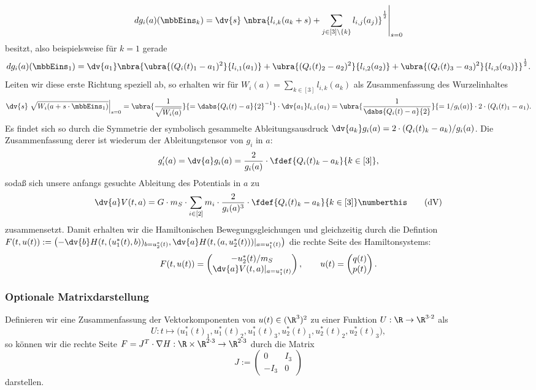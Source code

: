 \documentclass{subfiles}
\begin{document}
        \[
            dg_i(a)(\mbbEins_k) = \dv{s}\left.\nbra{l_{i,k}(a_k + s) + \sum_{j\in[3]\setminus{\{k\}}}l_{i,j}(a_j)}^{\frac12}\right|_{s=0}
        \]
        besitzt, also beispielsweise für $k=1$ gerade
        \[
            dg_i(a)(\mbbEins_1) = \dv{a_1}\nbra{\ubra{(Q_i(t)_1 - a_1)^2}{l_{i,1}(a_1)} + \ubra{(Q_i(t)_2 - a_2)^2}{l_{i,2}(a_2)} + \ubra{(Q_i(t)_3 - a_3)^2}{l_{i,3}(a_3)}}^{\frac12}.
        \]
        Leiten wir diese erste Richtung speziell ab, so erhalten wir für $W_i(a) = \sum_{k\in[3]}l_{i,k}(a_k)$ als Zusammenfassung des Wurzelinhaltes
        \[
            \dv{s}\left.\sqrt{W_i(a + s\cdot\mbbEins_1)}\right|_{s=0} = \ubra{\frac{1}{\sqrt{W_i(a)}}}{=\dabs{Q_i(t) - a}{2}^{-1}}\cdot\dv{a_1}l_{i,1}(a_1) = \ubra{\frac{1}{\dabs{Q_i(t) - a}{2}}}{= 1/g_i(a)}\cdot 2\cdot (Q_i(t)_1 - a_1). 
        \]
        Es findet sich so durch die Symmetrie der symbolisch gesammelte Ableitungsausdruck $\dv{a_k}g_i(a) = 2\cdot (Q_i(t)_k - a_k) / g_i(a)$. Die Zusammenfassung derer ist wiederum der Ableitungstensor von $g_i$ in $a$:
        \[
            g_i'(a) = \dv{a}g_i(a) = \frac{2}{g_i(a)}\cdot\fdef{Q_i(t)_k - a_k}{k\in[3]},
        \]
        sodaß sich unsere anfangs gesuchte Ableitung des Potentials in $a$ zu 
        \[
            \dv{a}V(t,a) = G\cdot m_S\cdot\sum_{i\in[2]}m_i\cdot\frac{2}{g_i(a)^3}\cdot\fdef{Q_i(t)_k - a_k}{k\in[3]}\numberthis\label{eq:dV}\tag{dV}
        \]
        zusammensetzt. Damit erhalten wir die Hamiltonischen Bewegungsgleichungen und gleichzeitig durch die Defintion $F(t,u(t)):=\bigl(-\dv{b}H(t,(u_1^*(t),b))_{b=u_2^*(t)},\dv{a}H(t,(a,u_2^*(t)))|_{a=u_1^*(t)}\bigr)$ die rechte Seite des Hamiltonsystems:
        \begin{align*}
            F(t,u(t)) = \begin{pmatrix}
                -u_2^*(t)/m_S\\
                \dv{a}V(t,a)|_{a=u_1^* (t)}
            \end{pmatrix}, \qquad u(t) = \begin{pmatrix}
                q(t)\\
                p(t)
            \end{pmatrix}.
        \end{align*}

    \subsubsection*{Optionale Matrixdarstellung}
        Definieren wir eine Zusammenfassung der Vektorkomponenten von $u(t)\in(\R^3)^2$ zu einer Funktion $U:\R\to\R^{3\cdot 2}$ als
        \[
            U:t\mapsto \bigl(u_1^*(t)_1,u_1^*(t)_2,u_1^*(t)_3,u_2^*(t)_1,u_2^*(t)_2,u_2^*(t)_3\bigr),
        \]
        so können wir die rechte Seite $F=J^T\cdot\nabla H:\R\times\R^{2\cdot 3}\to\R^{2\cdot 3}$ durch die Matrix
        \[
            J:=\begin{pmatrix}
                0 & I_{3} \\
                -I_{3} & 0
            \end{pmatrix}
        \]
        darstellen.
\end{document}

